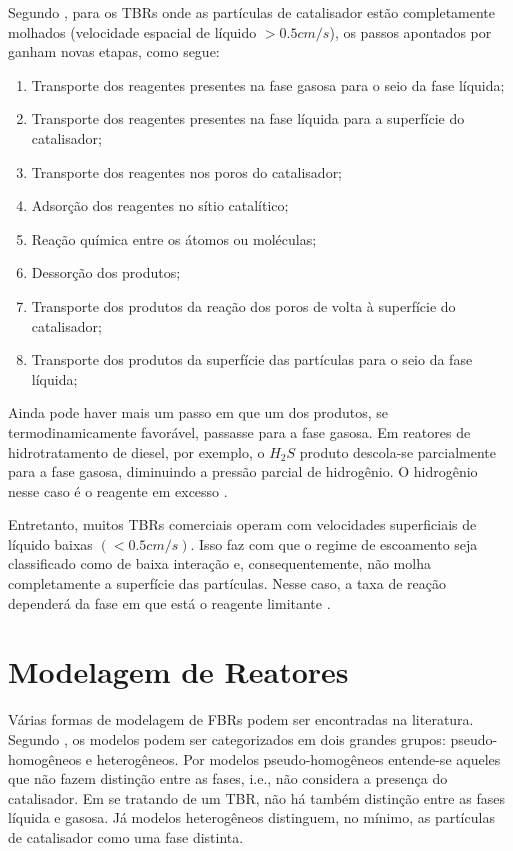 Segundo , para os TBRs onde as partículas de
catalisador estão completamente molhados (velocidade espacial de líquido $>0.5
cm/s$), os passos apontados por  ganham novas etapas,
como segue:

\begin{enumerate}
\item Transporte dos reagentes presentes na fase gasosa para o seio da
fase líquida;
\item Transporte dos reagentes presentes na fase líquida para a superfície do
catalisador;
\item Transporte dos reagentes nos poros do catalisador;
\item Adsorção dos reagentes no sítio catalítico;
\item Reação química entre os átomos ou moléculas;
\item Dessorção dos produtos;
\item Transporte dos produtos da reação dos poros de volta à
superfície do catalisador;
\item Transporte dos produtos da superfície das partículas para o seio da fase
líquida;
\end{enumerate} 

Ainda pode haver mais um passo em que um dos produtos, se termodinamicamente
favorável, passasse para a fase gasosa. Em reatores de hidrotratamento de
diesel, por exemplo, o $H_2S$ produto descola-se parcialmente para a fase
gasosa, diminuindo a pressão parcial de hidrogênio. O hidrogênio nesse caso é
o reagente em excesso \cite{Ancheyta2011}.

Entretanto, muitos TBRs comerciais operam com velocidades superficiais de
líquido baixas $(<0.5 cm/s)$. Isso faz com que o regime de escoamento seja
classificado como de baixa interação e, consequentemente, não molha
completamente a superfície das partículas. Nesse caso, a taxa de reação
dependerá da fase em que está o reagente limitante \cite{Ranade2011}. 


\section {Modelagem de Reatores} \label{sec:modelagemreatores}

Várias formas de modelagem de FBRs podem ser encontradas na literatura.
Segundo , os modelos podem ser categorizados em dois grandes
grupos: pseudo-homogêneos e heterogêneos. Por modelos pseudo-homogêneos entende-se aqueles que não fazem
distinção entre as fases, i.e., não considera a presença do catalisador. Em se
tratando de um TBR, não há também distinção entre as fases líquida e gasosa. Já
modelos heterogêneos distinguem, no mínimo, as partículas de catalisador como uma fase distinta.

